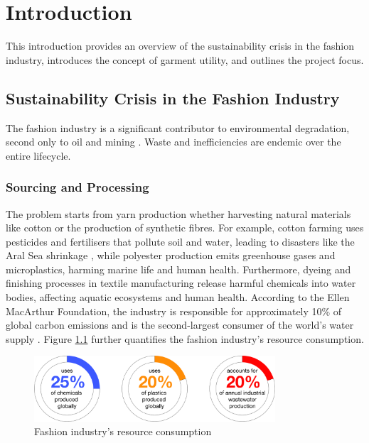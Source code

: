 \chapter{Introduction}

This introduction provides an overview of the sustainability crisis in the fashion industry, introduces the concept of garment utility, and outlines the project focus.

\section{Sustainability Crisis in the Fashion Industry}
The fashion industry is a significant contributor to environmental degradation, second only to oil and mining \cite{charter_accelerating_2024}. Waste and inefficiencies are endemic over the entire lifecycle. 
\subsection{Sourcing and Processing}
The problem starts from yarn production whether harvesting natural materials like cotton or the production of synthetic fibres. For example, cotton farming uses pesticides and fertilisers that pollute soil and water, leading to disasters like the Aral Sea shrinkage \cite{noauthor_world_2014}, while polyester production emits greenhouse gases and microplastics, harming marine life and human health. Furthermore, dyeing and finishing processes in textile manufacturing release harmful chemicals into water bodies, affecting aquatic ecosystems and human health. According to the Ellen MacArthur Foundation, the industry is responsible for approximately 10\% of global carbon emissions and is the second-largest consumer of the world's water supply \cite{ellen_macarthur_foundation_new_2017}. Figure \ref{fig:resource_consumption} further quantifies the fashion industry's resource consumption.
\begin{figure} [H]
    \centering
    \includegraphics[width=0.8\textwidth]{Images/sourcing donuts.png}
    \caption{Fashion industry's resource consumption \cite{charter_accelerating_2024}}
    \label{fig:resource_consumption}
\end{figure}
